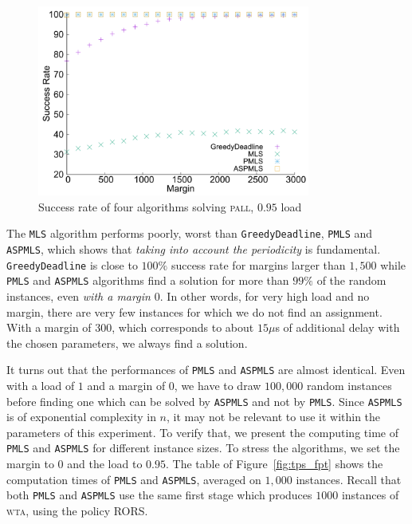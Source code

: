 \documentclass[a4paper,10pt]{journal}
\newcommand\greedydeadline{\texttt{GreedyDeadline}\xspace}
\newcommand\MLS{\texttt{MLS}\xspace}
\newcommand\PMLS{\texttt{PMLS}\xspace}
\newcommand\ASPMLS{\texttt{ASPMLS}\xspace}
\newcommand\pall{\textsc{pall}\xspace}
\newcommand\wta{\textsc{wta}\xspace}
\begin{document}
    \begin{figure} [h] 
       \begin{center}
      \includegraphics[width=0.8\textwidth]{retour_21000.pdf}
      \end{center}
      \caption{Success rate of four algorithms solving \pall, $0.95$ load}
     \label{fig:success21000}
     \end{figure}
     
      The \MLS algorithm performs poorly, worst than \greedydeadline, \PMLS and \ASPMLS, which shows that \emph{taking into account the periodicity} is fundamental.
      \greedydeadline is close to $100\%$ success rate for margins larger than $1,500$ while  \PMLS and \ASPMLS algorithms find a solution for more than $99\%$ of the random instances, even \emph{with a margin $0$}. In other words, for very high load and no margin, there are very few instances for which we do not find an assignment. With a margin of $300$, which corresponds to about $15\mu$s of additional delay with the chosen parameters, we always find a solution. 
     
     It turns out that the performances of \PMLS and \ASPMLS are almost identical. Even with a load of $1$ and a margin of $0$, we have to draw $100,000$ random instances before finding one which can be solved by \ASPMLS and not by \PMLS. Since \ASPMLS is of exponential complexity in $n$, it may not be relevant to use it within the parameters of this experiment. To verify that, we present the computing time of \PMLS and \ASPMLS for different instance sizes. To stress the algorithms, we set the margin to $0$ and the load to $0.95$. The table of Figure~\ref{fig:tps_fpt} shows the computation times of \PMLS and \ASPMLS, averaged on $1,000$ instances. Recall that both \PMLS and \ASPMLS use the same first stage which produces $1000$ instances of \wta, using the policy RORS.
\end{document}
